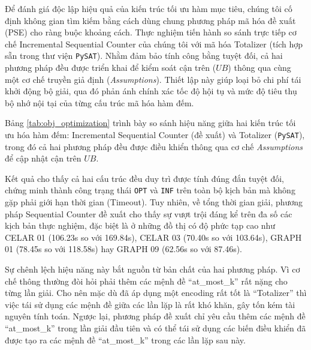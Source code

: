 Để đánh giá độc lập hiệu quả của kiến trúc tối ưu hàm mục tiêu, chúng tôi cố định không gian tìm kiếm bằng cách dùng chung phương pháp mã hóa đề xuất (PSE) cho ràng buộc khoảng cách. Thực nghiệm tiến hành so sánh trực tiếp cơ chế Incremental Sequential Counter của chúng tôi với mã hóa Totalizer (tích hợp sẵn trong thư viện \texttt{PySAT}). Nhằm đảm bảo tính công bằng tuyệt đối, cả hai phương pháp đều được triển khai để kiểm soát cận trên ($UB$) thông qua cùng một cơ chế truyền giả định (\textit{Assumptions}). Thiết lập này giúp loại bỏ chi phí tái khởi động bộ giải, qua đó phản ánh chính xác tốc độ hội tụ và mức độ tiêu thụ bộ nhớ nội tại của từng cấu trúc mã hóa hàm đếm.

Bảng \ref{tab:obj_optimization} trình bày so sánh hiệu năng giữa hai kiến trúc tối ưu hóa hàm đếm: Incremental Sequential Counter (đề xuất) và Totalizer (\texttt{PySAT}), trong đó cả hai phương pháp đều được điều khiển thông qua cơ chế \textit{Assumptions} để cập nhật cận trên $UB$.

Kết quả cho thấy cả hai cấu trúc đều duy trì được tính đúng đắn tuyệt đối, chứng minh thành công trạng thái \texttt{OPT} và \texttt{INF} trên toàn bộ kịch bản mà không gặp phải giới hạn thời gian (Timeout). Tuy nhiên, về tổng thời gian giải, phương pháp Sequential Counter đề xuất cho thấy sự vượt trội đáng kể trên đa số các kịch bản thực nghiệm, đặc biệt là ở những đồ thị có độ phức tạp cao như CELAR 01 (106.23s so với 169.84s), CELAR 03 (70.40s so với 103.64s), GRAPH 01 (78.45s so với 118.58s) hay GRAPH 09 (62.56s so với 87.46s). 

Sự chênh lệch hiệu năng này bắt nguồn từ bản chất của hai phương pháp. Vì cơ chế thông thường đòi hỏi phải thêm các mệnh đề ``at\_most\_k'' rất nặng cho từng lần giải. Cho nên mặc dù đã áp dụng một encoding rất tốt là ``Totalizer'' thì việc tái sử dụng các mệnh đề giữa các lần lặp là rất khó khăn, gây tốn kém tài nguyên tính toán. Ngược lại, phương pháp đề xuất chỉ yêu cầu thêm các mệnh đề ``at\_most\_k'' trong lần giải đầu tiên và có thể tái sử dụng các biến điều khiển đã được tạo ra các mệnh đề ``at\_most\_k'' trong các lần lặp sau này.


